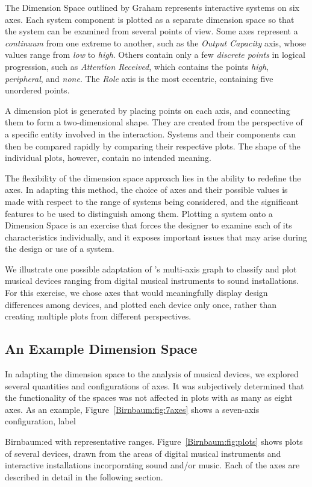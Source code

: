 {The Dimension Space outlined  by Graham \cite{Graham:2000} represents interactive systems on six axes. Each system component is plotted as a separate dimension space so that the system can be examined from several points of view. Some axes represent a \emph{continuum} from one extreme to another, such as the \emph{Output Capacity} axis, whose values range from \emph{low} to \emph{high}. Others contain only a few \emph{discrete points} in logical progression, such as \emph{Attention Received}, which contains the points \emph{high}, \emph{peripheral}, and \emph{none}. The \emph{Role} axis is the most eccentric, containing five unordered points.

A dimension plot is generated by placing points on each axis, and connecting them to form a two-dimensional shape. They are created from the perspective of a specific entity involved in the interaction. Systems and their components can then be compared rapidly by comparing their respective plots. The shape of the individual plots, however, contain no intended meaning.

The flexibility of the dimension space approach lies in the ability to redefine the axes. In adapting this method, the choice of axes and their possible values is made with respect to the range of systems being considered, and the significant features to be used to distinguish among them. Plotting a system onto a Dimension Space is an exercise that forces the designer to examine each of its characteristics individually, and it exposes important issues that may arise during the design or use of a system.

We illustrate one possible adaptation of \cite{Graham:2000}'s multi-axis graph to classify and plot musical devices ranging from digital musical instruments to sound installations. For this exercise, we chose axes that would meaningfully display design differences among devices, and plotted each device only once, rather than creating multiple plots from different perspectives.

\subsection{An Example Dimension Space}

In adapting the dimension space to the analysis of musical devices, we explored several quantities and configurations of axes. It was subjectively determined that the functionality of the spaces was not affected in plots with as many as eight axes. As an example, Figure~\ref{Birnbaum:fig:7axes} shows a seven-axis configuration, label{Birnbaum:ed with representative ranges. Figure~\ref{Birnbaum:fig:plots} shows plots of several devices, drawn from the areas of digital musical instruments and interactive installations incorporating sound and/or music. Each of the axes are described in detail in the following section.

}}
